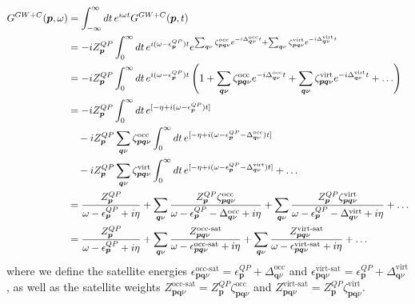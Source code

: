 \begin{align}
G^{GW+C}(\bm{p}, \omega) & = \int_{-\infty}^{\infty} dt\, e^{i \omega t} G^{GW+C}(\bm{p}, t) \\
& = -i Z_{\bm{p}}^{QP} \int_0^{\infty} dt\, e^{i(\omega - \epsilon_{\bm{p}}^{QP}) t} e^{\sum_{\bm{q}\nu} \zeta_{\bm{p}\bm{q}\nu}^{\text{occ}} e^{-i\Delta^{\text{occ}}_{\bm{q}\nu} t} + \sum_{\bm{q}\nu} \zeta_{\bm{p}\bm{q}\nu}^{\text{virt}} e^{-i\Delta^{\text{virt}}_{\bm{q}\nu} t}} \\
& = -i Z_{\bm{p}}^{QP} \int_0^{\infty} dt\, e^{i(\omega - \epsilon_{\bm{p}}^{QP}) t} \left(1 + \sum_{\bm{q}\nu} \zeta_{\bm{p}\bm{q}\nu}^{\text{occ}} e^{-i\Delta^{\text{occ}}_{\bm{q}\nu} t} + \sum_{\bm{q}\nu} \zeta_{\bm{p}\bm{q}\nu}^{\text{virt}} e^{-i\Delta^{\text{virt}}_{\bm{q}\nu} t} + \ldots \right) \\
&= -i Z_{\bm{p}}^{QP} \int_0^{\infty} dt\, e^{[-\eta + i(\omega - \epsilon_{\bm{p}}^{QP}) t]}\label{Gpp3} \\
&\quad - i Z_{\bm{p}}^{QP} \sum_{\bm{q}\nu} \zeta_{\bm{p}\bm{q}\nu}^{\text{occ}} \int_0^{\infty} dt\, e^{[-\eta + i(\omega - \epsilon_{\bm{p}}^{QP} - \Delta^{\text{occ}}_{\bm{q}\nu}) t]} \notag \\
&\quad - i Z_{\bm{p}}^{QP} \sum_{\bm{q}\nu} \zeta_{\bm{p}\bm{q}\nu}^{\text{virt}} \int_0^{\infty} dt\, e^{[-\eta + i(\omega - \epsilon_{\bm{p}}^{QP} - \Delta^{\text{virt}}_{\bm{q}\nu}) t]} + \ldots \notag \\
&= \frac{Z_{\bm{p}}^{QP}}{\omega - \epsilon_{\bm{p}}^{QP} + i\eta} + \sum_{\bm{q}\nu} \frac{Z_{\bm{p}}^{QP} \zeta_{\bm{p}\bm{q}\nu}^{\text{occ}}}{\omega - \epsilon_{\bm{p}}^{QP} - \Delta^{\text{occ}}_{\bm{q}\nu} + i\eta} + \sum_{\bm{q}\nu} \frac{Z_{\bm{p}}^{QP} \zeta_{\bm{p}\bm{q}\nu}^{\text{virt}}}{\omega - \epsilon_{\bm{p}}^{QP} - \Delta^{\text{virt}}_{\bm{q}\nu} + i\eta} + \ldots\\
& = \frac{Z_{\bm{p}}^{QP}}{\omega - \epsilon_{\bm{p}}^{QP} + i\eta} + \sum_{\bm{q}\nu} \frac{Z_{\bm{p}\bm{q}\nu}^{\text{occ-sat}}}{\omega - \epsilon_{\bm{p}\bm{q}\nu}^{\text{occ-sat}} + i\eta} + \sum_{\bm{q}\nu} \frac{Z_{\bm{p}\bm{q}\nu}^{\text{virt-sat}}}{\omega - \epsilon_{\bm{p}\bm{q}\nu}^{\text{virt-sat}} + i\eta} + \ldots
\end{align}
where we define the satellite energies $\epsilon_{\bm{p}\bm{q}\nu}^{\text{occ-sat}} = \epsilon_{\bm{p}}^{QP} + \Delta^{\text{occ}}_{\bm{q}\nu}$ and $\epsilon_{\bm{p}\bm{q}\nu}^{\text{virt-sat}} = \epsilon_{\bm{p}}^{QP} + \Delta^{\text{virt}}_{\bm{q}\nu}$, as well as the satellite weights $Z_{\bm{p}\bm{q}\nu}^{\text{occ-sat}} = Z_{\bm{p}}^{QP} \zeta_{\bm{p}\bm{q}\nu}^{\text{occ}}$ and $Z_{\bm{p}\bm{q}\nu}^{\text{virt-sat}} = Z_{\bm{p}}^{QP} \zeta_{\bm{p}\bm{q}\nu}^{\text{virt}}$.
